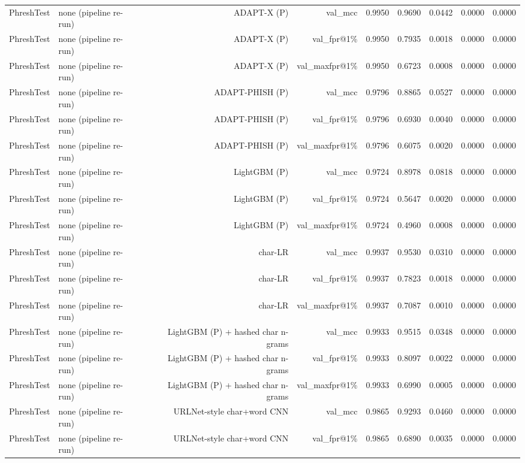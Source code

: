 \begin{table}[t]
\begin{tabular}{llrrrrrrr}
PhreshTest & none (pipeline re-run) & ADAPT-X (P) & val\_mcc & 0.9950 & 0.9690 & 0.0442 & 0.0000 & 0.0000 \\
PhreshTest & none (pipeline re-run) & ADAPT-X (P) & val\_fpr@1\% & 0.9950 & 0.7935 & 0.0018 & 0.0000 & 0.0000 \\
PhreshTest & none (pipeline re-run) & ADAPT-X (P) & val\_maxfpr@1\% & 0.9950 & 0.6723 & 0.0008 & 0.0000 & 0.0000 \\
PhreshTest & none (pipeline re-run) & ADAPT-PHISH (P) & val\_mcc & 0.9796 & 0.8865 & 0.0527 & 0.0000 & 0.0000 \\
PhreshTest & none (pipeline re-run) & ADAPT-PHISH (P) & val\_fpr@1\% & 0.9796 & 0.6930 & 0.0040 & 0.0000 & 0.0000 \\
PhreshTest & none (pipeline re-run) & ADAPT-PHISH (P) & val\_maxfpr@1\% & 0.9796 & 0.6075 & 0.0020 & 0.0000 & 0.0000 \\
PhreshTest & none (pipeline re-run) & LightGBM (P) & val\_mcc & 0.9724 & 0.8978 & 0.0818 & 0.0000 & 0.0000 \\
PhreshTest & none (pipeline re-run) & LightGBM (P) & val\_fpr@1\% & 0.9724 & 0.5647 & 0.0020 & 0.0000 & 0.0000 \\
PhreshTest & none (pipeline re-run) & LightGBM (P) & val\_maxfpr@1\% & 0.9724 & 0.4960 & 0.0008 & 0.0000 & 0.0000 \\
PhreshTest & none (pipeline re-run) & char-LR & val\_mcc & 0.9937 & 0.9530 & 0.0310 & 0.0000 & 0.0000 \\
PhreshTest & none (pipeline re-run) & char-LR & val\_fpr@1\% & 0.9937 & 0.7823 & 0.0018 & 0.0000 & 0.0000 \\
PhreshTest & none (pipeline re-run) & char-LR & val\_maxfpr@1\% & 0.9937 & 0.7087 & 0.0010 & 0.0000 & 0.0000 \\
PhreshTest & none (pipeline re-run) & LightGBM (P) + hashed char n-grams & val\_mcc & 0.9933 & 0.9515 & 0.0348 & 0.0000 & 0.0000 \\
PhreshTest & none (pipeline re-run) & LightGBM (P) + hashed char n-grams & val\_fpr@1\% & 0.9933 & 0.8097 & 0.0022 & 0.0000 & 0.0000 \\
PhreshTest & none (pipeline re-run) & LightGBM (P) + hashed char n-grams & val\_maxfpr@1\% & 0.9933 & 0.6990 & 0.0005 & 0.0000 & 0.0000 \\
PhreshTest & none (pipeline re-run) & URLNet-style char+word CNN & val\_mcc & 0.9865 & 0.9293 & 0.0460 & 0.0000 & 0.0000 \\
PhreshTest & none (pipeline re-run) & URLNet-style char+word CNN & val\_fpr@1\% & 0.9865 & 0.6890 & 0.0035 & 0.0000 & 0.0000 \\

\end{tabular}
\end{table}
